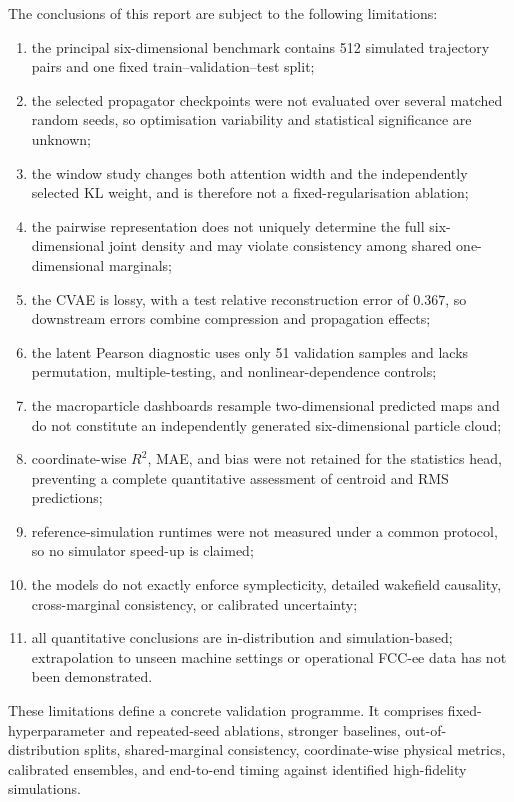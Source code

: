 The conclusions of this report are subject to the following limitations:
\begin{enumerate}
    \item the principal six-dimensional benchmark contains 512 simulated trajectory pairs and one fixed train--validation--test split;
    \item the selected propagator checkpoints were not evaluated over several matched random seeds, so optimisation variability and statistical significance are unknown;
    \item the window study changes both attention width and the independently selected KL weight, and is therefore not a fixed-regularisation ablation;
    \item the pairwise representation does not uniquely determine the full six-dimensional joint density and may violate consistency among shared one-dimensional marginals;
    \item the CVAE is lossy, with a test relative reconstruction error of $0.367$, so downstream errors combine compression and propagation effects;
    \item the latent Pearson diagnostic uses only 51 validation samples and lacks permutation, multiple-testing, and nonlinear-dependence controls;
    \item the macroparticle dashboards resample two-dimensional predicted maps and do not constitute an independently generated six-dimensional particle cloud;
    \item coordinate-wise $R^2$, MAE, and bias were not retained for the statistics head, preventing a complete quantitative assessment of centroid and RMS predictions;
    \item reference-simulation runtimes were not measured under a common protocol, so no simulator speed-up is claimed;
    \item the models do not exactly enforce symplecticity, detailed wakefield causality, cross-marginal consistency, or calibrated uncertainty;
    \item all quantitative conclusions are in-distribution and simulation-based; extrapolation to unseen machine settings or operational FCC-ee data has not been demonstrated.
\end{enumerate}

These limitations define a concrete validation programme. It comprises fixed-hyperparameter and repeated-seed ablations, stronger baselines, out-of-distribution splits, shared-marginal consistency, coordinate-wise physical metrics, calibrated ensembles, and end-to-end timing against identified high-fidelity simulations.

